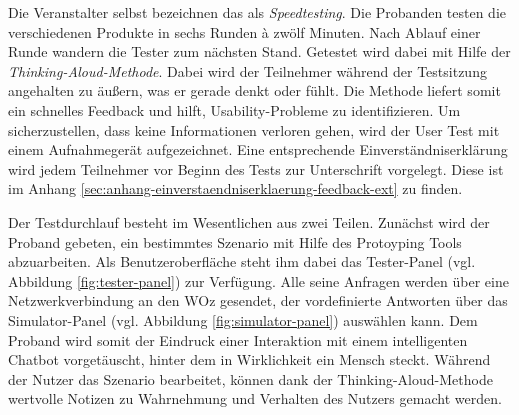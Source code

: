 Die Veranstalter selbst bezeichnen das als \textit{Speedtesting}. Die Probanden testen die verschiedenen Produkte in sechs Runden à zwölf Minuten. Nach Ablauf einer Runde wandern die Tester zum nächsten Stand. Getestet wird dabei mit Hilfe der \textit{Thinking-Aloud-Methode}. Dabei wird der Teilnehmer während der Testsitzung angehalten zu äußern, was er gerade denkt oder fühlt. Die Methode liefert somit ein schnelles Feedback und hilft, Usability-Probleme zu identifizieren. Um sicherzustellen, dass keine Informationen verloren gehen, wird der User Test mit einem Aufnahmegerät aufgezeichnet. Eine entsprechende Einverständniserklärung wird jedem Teilnehmer vor Beginn des Tests zur Unterschrift vorgelegt. Diese ist im Anhang \ref{sec:anhang-einverstaendniserklaerung-feedback-ext} zu finden. 

Der Testdurchlauf besteht im Wesentlichen aus zwei Teilen. Zunächst wird der Proband gebeten, ein bestimmtes Szenario mit Hilfe des Protoyping Tools abzuarbeiten. Als Benutzeroberfläche steht ihm dabei das Tester-Panel (vgl. Abbildung \ref{fig:tester-panel}) zur Verfügung. Alle seine Anfragen werden über eine Netzwerkverbindung an den \acl{WOz} gesendet, der vordefinierte Antworten über das Simulator-Panel (vgl. Abbildung \ref{fig:simulator-panel}) auswählen kann. Dem Proband wird somit der Eindruck einer Interaktion mit einem intelligenten Chatbot vorgetäuscht, hinter dem in Wirklichkeit ein Mensch steckt. Während der Nutzer das Szenario bearbeitet, können dank der Thinking-Aloud-Methode wertvolle Notizen zu Wahrnehmung und Verhalten des Nutzers gemacht \mbox{werden}. 


